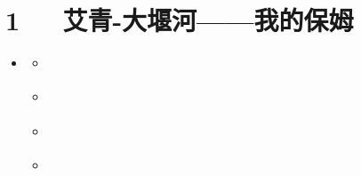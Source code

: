 \documentclass[letterpaper,10pt,english]{sphinxmanual}
\begin{document}
\chapter{1   艾青-大堰河——我的保姆}
\label{\detokenize{p01_u6563_u6587/_u827e_u9752-_u5927_u5830_u6cb3_u2014_u2014_u6211_u7684_u4fdd_u59c6:id1}}\label{\detokenize{p01_u6563_u6587/_u827e_u9752-_u5927_u5830_u6cb3_u2014_u2014_u6211_u7684_u4fdd_u59c6::doc}}
\begin{sphinxShadowBox}
\begin{itemize}
\item {} 
\label{\detokenize{p01_u6563_u6587/_u827e_u9752-_u5927_u5830_u6cb3_u2014_u2014_u6211_u7684_u4fdd_u59c6:id7}}{\hyperref[\detokenize{p01_u6563_u6587/_u827e_u9752-_u5927_u5830_u6cb3_u2014_u2014_u6211_u7684_u4fdd_u59c6:id1}]{}}
\begin{itemize}
\item {} 
\label{\detokenize{p01_u6563_u6587/_u827e_u9752-_u5927_u5830_u6cb3_u2014_u2014_u6211_u7684_u4fdd_u59c6:id8}}{\hyperref[\detokenize{p01_u6563_u6587/_u827e_u9752-_u5927_u5830_u6cb3_u2014_u2014_u6211_u7684_u4fdd_u59c6:id3}]{}}

\item {} 
\label{\detokenize{p01_u6563_u6587/_u827e_u9752-_u5927_u5830_u6cb3_u2014_u2014_u6211_u7684_u4fdd_u59c6:id9}}{\hyperref[\detokenize{p01_u6563_u6587/_u827e_u9752-_u5927_u5830_u6cb3_u2014_u2014_u6211_u7684_u4fdd_u59c6:id4}]{}}

\item {} 
\label{\detokenize{p01_u6563_u6587/_u827e_u9752-_u5927_u5830_u6cb3_u2014_u2014_u6211_u7684_u4fdd_u59c6:id10}}{\hyperref[\detokenize{p01_u6563_u6587/_u827e_u9752-_u5927_u5830_u6cb3_u2014_u2014_u6211_u7684_u4fdd_u59c6:id5}]{}}

\item {} 
\label{\detokenize{p01_u6563_u6587/_u827e_u9752-_u5927_u5830_u6cb3_u2014_u2014_u6211_u7684_u4fdd_u59c6:id11}}{\hyperref[\detokenize{p01_u6563_u6587/_u827e_u9752-_u5927_u5830_u6cb3_u2014_u2014_u6211_u7684_u4fdd_u59c6:id6}]{}}

\end{itemize}

\end{itemize}
\end{sphinxShadowBox}
\end{document}
